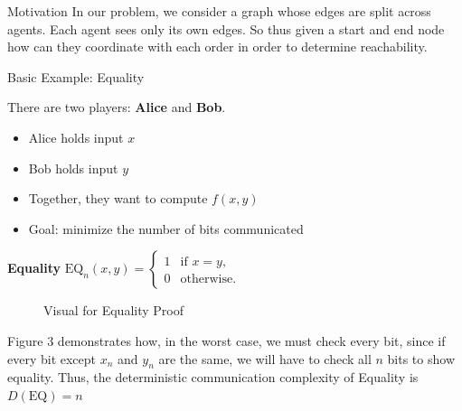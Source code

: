 \documentclass[final]{beamer}
\newlength{\onecolwid}
\begin{document}
\begin{frame}[t]
\begin{columns}[t]
\begin{column}{\onecolwid}
\begin{block}{Motivation}
In our problem, we consider a graph whose edges are split across agents. Each agent sees only its own edges. So thus given a start and end node how can they coordinate with each order in order to determine reachability. \\
\end{block}


\begin{block}{Basic Example: Equality}

There are two players: \textbf{Alice} and \textbf{Bob}.  
\begin{itemize}
    \item Alice holds input $x$
    \item Bob holds input $y$
    \item Together, they want to compute $f(x,y)$
    \item Goal: minimize the number of bits communicated
\end{itemize}


\textbf{Equality} \small$
\mathrm{EQ}_n(x,y) =
\begin{cases}
1 & \text{if } x = y, \\
0 & \text{otherwise.}
\end{cases}
$
\\

\begin{figure}[H]
\centering
{}
\caption {Visual for Equality Proof}
\end{figure}

\normalsize Figure 3 demonstrates how, in the worst case, we must check every bit, since if
every bit except $x_n$ and $y_n$ are the same, we will have to check all $n$
bits to show equality.  Thus, the deterministic communication complexity of
Equality is $D(\text{EQ}) = n$


\end{block}
\end{column}
\end{columns}
\end{frame}
\end{document}
